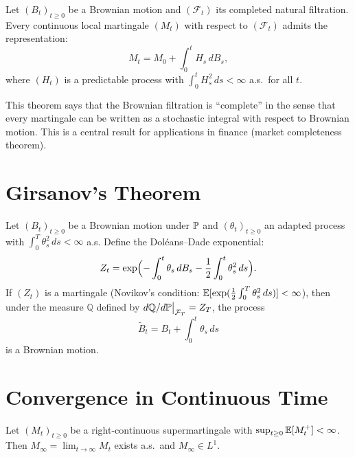 \begin{theorem}
\label{thm:representation}
Let $(B_t)_{t \geq 0}$ be a Brownian motion and $(\mathcal{F}_t)$ its completed
natural filtration. Every continuous local martingale $(M_t)$ with respect to
$(\mathcal{F}_t)$ admits the representation:
\[
  M_t = M_0 + \int_0^t H_s \, dB_s,
\]
where $(H_t)$ is a predictable process with $\int_0^t H_s^2 \, ds < \infty$
a.s.\ for all $t$.
\end{theorem}

\begin{intuition}[title=\textbf{Completeness of the Brownian Filtration}]
This theorem says that the Brownian filtration is ``complete'' in the sense
that every martingale can be written as a stochastic integral with respect to
Brownian motion. This is a central result for applications in finance (market
completeness theorem).
\end{intuition}

\section{Girsanov's Theorem}

\begin{theorem}[Girsanov]
\label{thm:girsanov}
Let $(B_t)_{t \geq 0}$ be a Brownian motion under $\mathbb{P}$ and $(\theta_t)_{t \geq 0}$
an adapted process with $\int_0^T \theta_s^2 \, ds < \infty$ a.s. Define the
Dol\'eans--Dade exponential:
\[
  Z_t = \exp\Bigl(-\int_0^t \theta_s \, dB_s - \frac{1}{2} \int_0^t \theta_s^2 \, ds\Bigr).
\]
If $(Z_t)$ is a martingale (Novikov's condition:
$\mathbb{E}[\exp(\frac{1}{2}\int_0^T \theta_s^2 \, ds)] < \infty$), then under the
measure $\mathbb{Q}$ defined by
$d\mathbb{Q}/d\mathbb{P}\big|_{\mathcal{F}_T} = Z_T$, the process
\[
  \tilde{B}_t = B_t + \int_0^t \theta_s \, ds
\]
is a Brownian motion.
\end{theorem}

\section{Convergence in Continuous Time}

\begin{theorem}
\label{thm:continuous_convergence}
Let $(M_t)_{t \geq 0}$ be a right-continuous supermartingale with
$\sup_{t \geq 0} \mathbb{E}[M_t^+] < \infty$. Then $M_{\infty} = \lim_{t \to \infty} M_t$
exists a.s.\ and $M_{\infty} \in L^1$.
\end{theorem}

